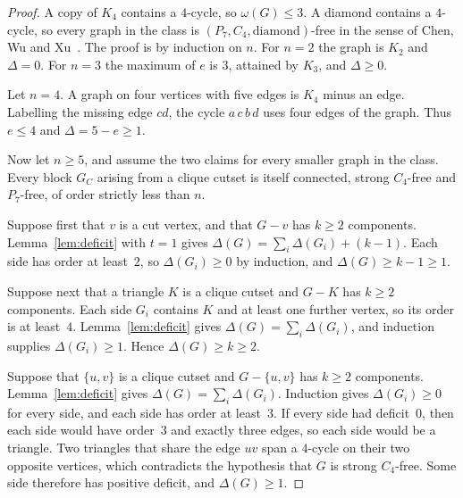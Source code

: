 \documentclass[ASNA]{USG}
\theoremstyle{WBstyletwo}
\numberwithin{equation}{section}
\begin{document}
\begin{proof}
A copy of $K_4$ contains a $4$-cycle, so $\omega(G)\le 3$. A diamond contains a $4$-cycle, so every graph in the class is $(P_7,C_4,\mathrm{diamond})$-free in the sense of Chen, Wu and Xu~\cite{cwx}. The proof is by induction on $n$. For $n=2$ the graph is $K_2$ and $\Delta=0$. For $n=3$ the maximum of $e$ is $3$, attained by $K_3$, and $\Delta\ge 0$.

Let $n=4$. A graph on four vertices with five edges is $K_4$ minus an edge. Labelling the missing edge $cd$, the cycle $a\,c\,b\,d$ uses four edges of the graph. Thus $e\le 4$ and $\Delta=5-e\ge 1$.

Now let $n\ge 5$, and assume the two claims for every smaller graph in the class. Every block $G_C$ arising from a clique cutset is itself connected, strong $C_4$-free and $P_7$-free, of order strictly less than $n$.

Suppose first that $v$ is a cut vertex, and that $G-v$ has $k\ge 2$ components. Lemma~\ref{lem:deficit} with $t=1$ gives $\Delta(G)=\sum_i\Delta(G_i)+(k-1)$. Each side has order at least~$2$, so $\Delta(G_i)\ge 0$ by induction, and $\Delta(G)\ge k-1\ge 1$.

Suppose next that a triangle $K$ is a clique cutset and $G-K$ has $k\ge 2$ components. Each side $G_i$ contains $K$ and at least one further vertex, so its order is at least~$4$. Lemma~\ref{lem:deficit} gives $\Delta(G)=\sum_i\Delta(G_i)$, and induction supplies $\Delta(G_i)\ge 1$. Hence $\Delta(G)\ge k\ge 2$.

Suppose that $\{u,v\}$ is a clique cutset and $G-\{u,v\}$ has $k\ge 2$ components. Lemma~\ref{lem:deficit} gives $\Delta(G)=\sum_i\Delta(G_i)$. Induction gives $\Delta(G_i)\ge 0$ for every side, and each side has order at least~$3$. If every side had deficit~$0$, then each side would have order~$3$ and exactly three edges, so each side would be a triangle. Two triangles that share the edge $uv$ span a $4$-cycle on their two opposite vertices, which contradicts the hypothesis that $G$ is strong $C_4$-free. Some side therefore has positive deficit, and $\Delta(G)\ge 1$.


\end{proof}
\end{document}
